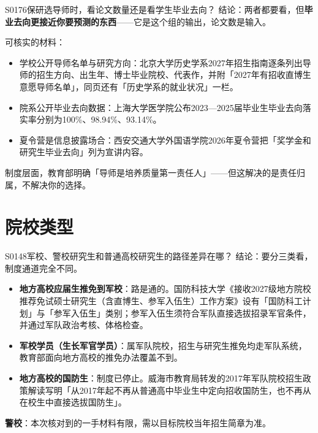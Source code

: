 \begin{qa}{S0176}{保研选导师时，看论文数量还是看学生毕业去向？}
结论：两者都要看，但\textbf{毕业去向更接近你要预测的东西}——它是这个组的输出，论文数是输入。

可核实的材料：
\begin{itemize}
  \item 学校公开导师名单与研究方向：北京大学历史学系2027年招生指南逐条列出导师的招生方向、出生年、博士毕业院校、代表作，并附「2027年有招收直博生意愿导师名单」，同页还有「历史学系的就业状况」一栏。
  \item 院系公开毕业去向数据：上海大学医学院公布2023—2025届毕业生毕业去向落实率分别为100\%、98.94\%、93.14\%。
  \item 夏令营是信息披露场合：西安交通大学外国语学院2026年夏令营把「奖学金和研究生毕业去向」列为宣讲内容。
\end{itemize}

制度层面，教育部明确「导师是培养质量第一责任人」——但这解决的是责任归属，不解决你的选择。
\end{qa}

\section{院校类型}
\begin{qa}{S0148}{军校、警校研究生和普通高校研究生的路径差异在哪？}
结论：要分三类看，制度通道完全不同。

\begin{itemize}
  \item \textbf{地方高校应届生推免到军校}：路是通的。国防科技大学《接收2027级地方院校推荐免试硕士研究生（含直博生、参军入伍生）工作方案》设有「国防科工计划」与「参军入伍生」类别；参军入伍生须符合军队直接选拔招录军官条件，并通过军队政治考核、体格检查。
  \item \textbf{军校学员（生长军官学员）}：属军队院校，招生与研究生推免均走军队系统，教育部面向地方高校的推免办法覆盖不到。
  \item \textbf{地方高校的国防生}：制度已停止。威海市教育局转发的2017年军队院校招生政策解读写明「从2017年起不再从普通高中毕业生中定向招收国防生，也不再从在校生中直接选拔国防生」。
\end{itemize}

\textbf{警校}：本次核对到的一手材料有限，需以目标院校当年招生简章为准。
\end{qa}

